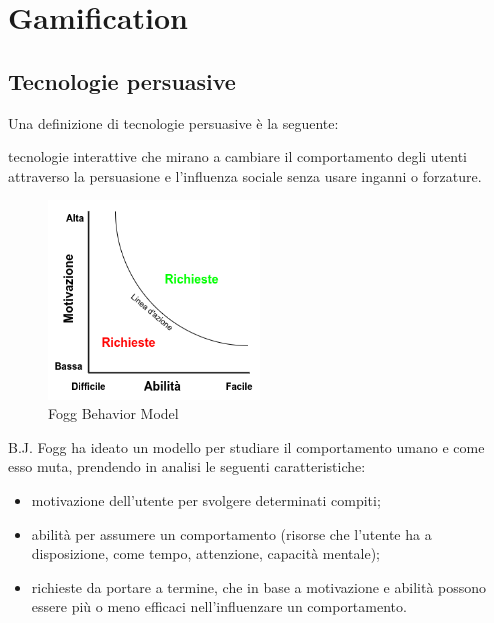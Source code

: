 \chapter{Gamification\label{sec:gamification}}

\section{Tecnologie persuasive\label{sec:tecnologie-persuasive}}

Una definizione di tecnologie persuasive è la seguente:
\begin{quoting}
    \omissis tecnologie interattive che mirano a cambiare il comportamento degli utenti attraverso la persuasione e l'influenza sociale senza usare inganni o forzature. \omissis
\end{quoting}

\begin{figure}[htp]
    \centering
    \includegraphics[width=0.5\textwidth]{immagini/Fogg_behavior_model.png}
    \caption{Fogg Behavior Model}
    \label{fig:fogg-behavior-model}
\end{figure}

B.J. Fogg ha ideato un modello per studiare il comportamento umano e come esso muta, prendendo in analisi le seguenti caratteristiche:
\begin{itemize}
    \item motivazione dell'utente per svolgere determinati compiti;
    \item abilità per assumere un comportamento (risorse che l'utente ha a disposizione, come tempo, attenzione, capacità mentale);
    \item richieste da portare a termine, che in base a motivazione e abilità possono essere più o meno efficaci nell'influenzare un comportamento.
\end{itemize}

